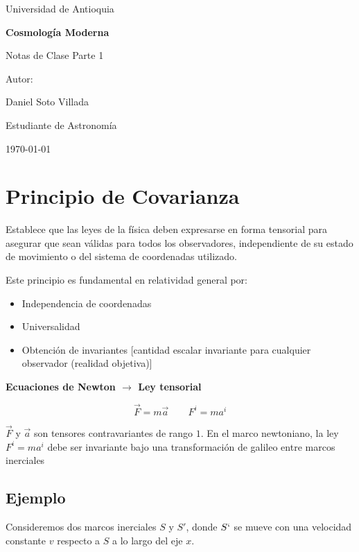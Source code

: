 \documentclass[a4paper]{article}
\begin{document}
\begin{titlepage}
  \centering
  {\Large Universidad de Antioquia\par}
  \vspace{2cm}
  {\huge\bfseries Cosmolog\'ia Moderna\par}
  \vspace{0.4cm}
  {\Large Notas de Clase Parte 1\par}
  \vspace{2.5cm}
  {\large Autor:\par}
  \vspace{0.2cm}
  {\large Daniel Soto Villada\par}
  {\large Estudiante de Astronom\'ia\par}
  \vfill
  {\large \today\par}
\end{titlepage}

\newpage
\tableofcontents
\newpage

\section{Principio de Covarianza}
Establece que las leyes de la física deben expresarse en forma tensorial para asegurar que sean válidas para todos los observadores, independiente de su estado de movimiento o del sistema de coordenadas utilizado.

Este principio es fundamental en relatividad general por:

\begin{itemize}
	\item Independencia de coordenadas
	\item Universalidad
	\item Obtención de invariantes [cantidad escalar invariante para cualquier observador (realidad objetiva)]
\end{itemize}

\textbf{Ecuaciones de Newton $\longrightarrow$ Ley tensorial}

$$\vec{F} = m\vec{a}\quad\quad F^{i}=ma^{i}$$

$\vec{F}$ y $\vec{a}$ son tensores contravariantes de rango $1$. En el marco newtoniano, la ley $F^{i}=ma^{i}$ debe ser invariante bajo una transformación de galileo entre marcos inerciales

\subsection{Ejemplo}
Consideremos dos marcos inerciales $S$ y $S'$, donde $S`$ se mueve con una velocidad constante $v$ respecto a $S$ a lo largo del eje $x$.
\end{document}
